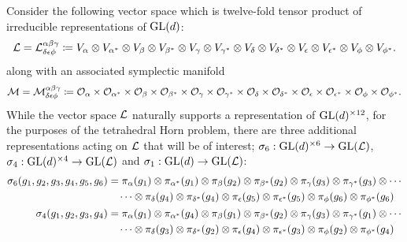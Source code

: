 \documentclass[notitlepage, 10pt]{article}
\begin{document}
\begin{rem}
    Consider the following vector space which is twelve-fold tensor product of irreducible representations of $\operatorname{GL}(d)$:
    \begin{equation}
        \mathcal L = \mathcal L^{\alpha\beta\gamma}_{\delta\epsilon\phi} \coloneqq V_{\alpha}\otimes V_{\alpha^*} \otimes V_{\beta} \otimes V_{\beta^*} \otimes V_{\gamma} \otimes V_{\gamma^*} \otimes V_{\delta} \otimes V_{\delta^*} \otimes V_{\epsilon} \otimes V_{\epsilon^*} \otimes V_{\phi} \otimes V_{\phi^*}.
    \end{equation}
    along with an associated symplectic manifold
    \begin{equation}
        \mathcal M = \mathcal M^{\alpha\beta\gamma}_{\delta\epsilon\phi} \coloneqq \mathcal O_{\alpha} \times \mathcal O_{\alpha^*} \times \mathcal O_{\beta} \times \mathcal O_{\beta^*} \times \mathcal O_{\gamma} \times \mathcal O_{\gamma^*} \times \mathcal O_{\delta} \times \mathcal O_{\delta^*} \times \mathcal O_{\epsilon} \times \mathcal O_{\epsilon^*} \times \mathcal O_{\phi} \times \mathcal O_{\phi^*}.
    \end{equation}
    While the vector space $\mathcal L$ naturally supports a representation of $\operatorname{GL}(d)^{\times 12}$, for the purposes of the tetrahedral Horn problem, there are three additional representations acting on $\mathcal L$ that will be of interest; $\sigma_6 : \operatorname{GL}(d)^{\times 6} \to \operatorname{GL}(\mathcal L)$, $\sigma_4 : \operatorname{GL}(d)^{\times 4} \to \operatorname{GL}(\mathcal L)$ and $\sigma_1 : \operatorname{GL}(d) \to \operatorname{GL}(\mathcal L)$:
    \begin{align}
        \begin{split}
            \label{eq:six_fold_action}
            \sigma_{6}(g_1, g_2, g_3, g_4, g_5, g_6)
            &= \pi_{\alpha}(g_1) \ot \pi_{\alpha^*}(g_1) \ot \pi_{\beta}(g_2) \ot \pi_{\beta^*}(g_2) \ot \pi_{\gamma}(g_3) \ot \pi_{\gamma^*}(g_3) \ot \cdots \\ &\quad\cdots\ot\pi_{\delta}(g_4) \ot \pi_{\delta^*}(g_4) \ot \pi_{\epsilon}(g_5) \ot \pi_{\epsilon^*}(g_5) \ot \pi_{\phi}(g_6) \ot \pi_{\phi^*}(g_6)
        \end{split}\\
        \begin{split}
            \label{eq:four_fold_action}
            \sigma_{4}(g_1, g_2, g_3, g_4) 
            &= \pi_{\alpha}(g_1) \ot \pi_{\alpha^*}(g_4) \ot \pi_{\beta}(g_1) \ot \pi_{\beta^*}(g_2) \ot \pi_{\gamma}(g_3) \ot \pi_{\gamma^*}(g_1) \ot \cdots \\ &\quad\cdots\ot\pi_{\delta}(g_3) \ot \pi_{\delta^*}(g_2) \ot \pi_{\epsilon}(g_4) \ot \pi_{\epsilon^*}(g_3) \ot \pi_{\phi}(g_2) \ot \pi_{\phi^*}(g_4)
        \end{split}\\

\end{align}
\end{rem}
\end{document}
